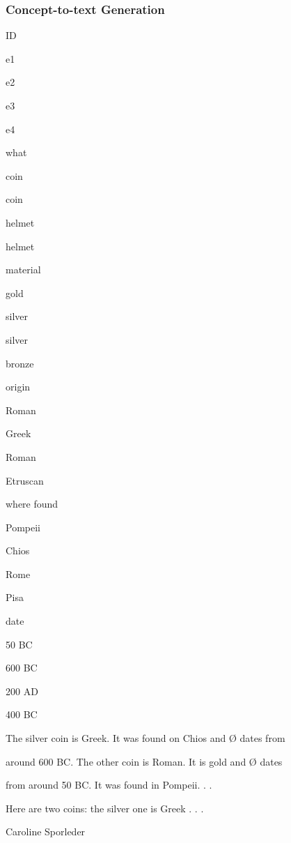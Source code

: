 \documentclass[compress,color=usenames]{beamer}
\begin{document}
\begin{frame}
\frametitle{Concept-to-text Generation}

ID

e1

e2

e3

e4

what

coin

coin

helmet

helmet

material

gold

silver

silver

bronze

origin

Roman

Greek

Roman

Etruscan

where found

Pompeii

Chios

Rome

Pisa

date

50 BC

600 BC

200 AD

400 BC

The silver coin is Greek. It was found on Chios and {\O} dates from

around 600 BC. The other coin is Roman. It is gold and {\O} dates

from around 50 BC. It was found in Pompeii. . .

Here are two coins: the silver one is Greek . . .

Caroline Sporleder

\end{frame}
\end{document}
